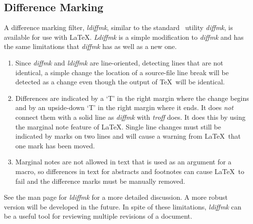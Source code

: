 \subsection{Difference Marking}
A difference marking filter, {\it ldiffmk}, similar to the standard \UNIX\
utility {\it diffmk}, is available for use with \LaTeX .  
{\it Ldiffmk} is a simple modification to {\it diffmk} and has the same limitations
that {\it diffmk} has as well as a new one. 
\begin{enumerate}
\item Since {\it diffmk} and {\it ldiffmk} are line-oriented,
detecting lines that are not identical, a simple change the location
of a source-file line break will be detected as a change even though
the output of \TeX\ will be identical.
\item Differences are indicated by a `T' in the right margin where
the change begins and by an upside-down `T' in the right margin
where it ends.  It does {\it not} connect them with a solid line as
{\it diffmk} with {\it troff} does.  It does this by using the
marginal note feature of \LaTeX .  Single line changes must still be
indicated by marks on two lines and will cause a warning from \LaTeX\
that one mark has been moved.  
\item Marginal notes are not allowed in text that is used as an
argument for a macro, so differences in text for abstracts and
footnotes can cause \LaTeX\ to fail and the difference marks must be
manually removed.
\end{enumerate}
See the man page for {\it ldiffmk} for a more detailed discussion.  A
more robust version will be developed in the future.  In spite of
these limitations, {\it ldiffmk} can be a useful tool for reviewing
multiple revisions of a document.
